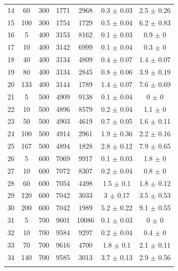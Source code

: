 \documentclass[11pt]{article}
\begin{document}
\begin{table}[]
{\begin{tabular}{ccccccc}
				\rowcolor[HTML]{EFEFEF} 
				14 & 60 & 300 & 1771 & 2968 & 0.3 $\pm$ 0.03 & 2.5 $\pm$ 0.26 \\
				\rowcolor[HTML]{EFEFEF} 
				15 & 100 & 300 & 1754 & 1729 & 0.5 $\pm$ 0.04 & 6.2 $\pm$ 0.83 \\
				16 & 5 & 400 & 3153 & 8162 & 0.1 $\pm$ 0.03 & 0.9 $\pm$ 0 \\
				17 & 10 & 400 & 3142 & 6999 & 0.1 $\pm$ 0.04 & 0.3 $\pm$ 0 \\
				18 & 40 & 400 & 3134 & 4809 & 0.4 $\pm$ 0.07 & 1.4 $\pm$ 0.07 \\
				19 & 80 & 400 & 3134 & 2845 & 0.8 $\pm$ 0.06 & 3.9 $\pm$ 0.19 \\
				20 & 133 & 400 & 3144 & 1789 & 1.4 $\pm$ 0.07 & 7.6 $\pm$ 0.69 \\
				\rowcolor[HTML]{EFEFEF} 
				21 & 5 & 500 & 4909 & 9138 & 0.1 $\pm$ 0.04 & 0 $\pm$ 0 \\
				\rowcolor[HTML]{EFEFEF} 
				22 & 10 & 500 & 4896 & 8579 & 0.2 $\pm$ 0.04 & 1.1 $\pm$ 0 \\
				\rowcolor[HTML]{EFEFEF} 
				23 & 50 & 500 & 4903 & 4619 & 0.7 $\pm$ 0.05 & 1.6 $\pm$ 0.11 \\
				\rowcolor[HTML]{EFEFEF} 
				24 & 100 & 500 & 4914 & 2961 & 1.9 $\pm$ 0.36 & 2.2 $\pm$ 0.16 \\
				\rowcolor[HTML]{EFEFEF} 
				25 & 167 & 500 & 4894 & 1828 & 2.8 $\pm$ 0.12 & 7.9 $\pm$ 0.65 \\
				26 & 5 & 600 & 7069 & 9917 & 0.1 $\pm$ 0.03 & 1.8 $\pm$ 0 \\
				27 & 10 & 600 & 7072 & 8307 & 0.2 $\pm$ 0.04 & 0.8 $\pm$ 0 \\
				28 & 60 & 600 & 7054 & 4498 & 1.5 $\pm$ 0.1 & 1.8 $\pm$ 0.12 \\
				29 & 120 & 600 & 7042 & 3033 & 3 $\pm$ 0.17 & 3.5 $\pm$ 0.53 \\
				30 & 200 & 600 & 7042 & 1989 & 5.2 $\pm$ 0.22 & 9.1 $\pm$ 0.55 \\
				\rowcolor[HTML]{EFEFEF} 
				31 & 5 & 700 & 9601 & 10086 & 0.1 $\pm$ 0.03 & 0 $\pm$ 0 \\
				\rowcolor[HTML]{EFEFEF} 
				32 & 10 & 700 & 9584 & 9297 & 0.2 $\pm$ 0.04 & 0.4 $\pm$ 0 \\
				\rowcolor[HTML]{EFEFEF} 
				33 & 70 & 700 & 9616 & 4700 & 1.8 $\pm$ 0.1 & 2.1 $\pm$ 0.11 \\
				\rowcolor[HTML]{EFEFEF} 
				34 & 140 & 700 & 9585 & 3013 & 3.7 $\pm$ 0.13 & 2.9 $\pm$ 0.56 \\
				\rowcolor[HTML]{EFEFEF} 

\end{tabular}}
\end{table}
\end{document}
